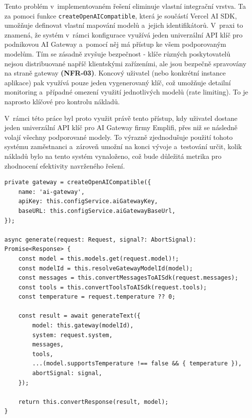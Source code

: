 \documentclass[czech, ing, kiv, he, iso690numb, viewonly]{fasthesis}
\begin{document}
Tento problém v~implementovaném řešení eliminuje vlastní integrační vrstva. 
Ta za pomoci funkce \texttt{createOpenAICompatible}, která je součástí Vercel AI SDK, 
umožňuje definovat vlastní mapování modelů a~jejich identifikátorů. V~praxi to znamená, 
že systém v~rámci konfigurace využívá jeden univerzální API klíč pro podnikovou AI Gateway a~pomocí něj má přístup ke všem podporovaným modelům. Tím se zásadně zvyšuje bezpečnost - klíče 
různých poskytovatelů nejsou distribuované napříč klientskými zařízeními, ale jsou bezpečně spravovány 
na straně gateway \textbf{(NFR-03)}. Koncový uživatel (nebo konkrétní instance aplikace) pak využívá pouze jeden vygenerovaný klíč, 
což umožňuje detailní monitoring a~případné omezení využití jednotlivých modelů (rate limiting). To je naprosto klíčové 
pro kontrolu nákladů.

V~rámci této práce byl proto využit právě tento přístup, kdy uživatel dostane jeden univerzální API klíč pro AI Gateway firmy 
Emplifi, přes niž se následně volají všechny podporované modely. To výrazně zjednodušuje použití tohoto systému 
zaměstnanci a~zároveň umožní na konci vývoje a~testování určit, kolik nákladů bylo na tento systém vynaloženo, což
bude důležitá metrika pro zhodnocení efektivity navrženého řešení.

\begin{lstlisting}[style=tscode, caption={Zjednodušené napojení Vercel AI SDK na vlastní AI Gateway}, label={lst:llm-custom-provider}]
private gateway = createOpenAICompatible({
    name: 'ai-gateway',
    apiKey: this.configService.aiGatewayKey,
    baseURL: this.configService.aiGatewayBaseUrl,
});

async generate(request: Request, signal?: AbortSignal): Promise<Response> {
    const model = this.models.get(request.model)!;
    const modelId = this.resolveGatewayModelId(model); 
    const messages = this.convertMessagesToAISdk(request.messages);
    const tools = this.convertToolsToAISdk(request.tools);
    const temperature = request.temperature ?? 0;

    const result = await generateText({
        model: this.gateway(modelId),
        system: request.system,
        messages,
        tools,
        ...(model.supportsTemperature !== false && { temperature }),
        abortSignal: signal,
    });

    return this.convertResponse(result, model);
}
\end{lstlisting}
\end{document}
